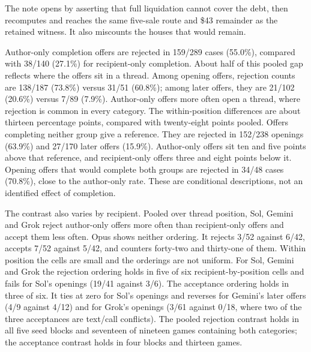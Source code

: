 
The note opens by asserting that full liquidation cannot cover the debt, then recomputes and reaches the same five-sale route and \$43 remainder as the retained witness. It also miscounts the houses that would remain.


Author-only completion offers are rejected in 159/289 cases (55.0\%), compared with 38/140 (27.1\%) for recipient-only completion. About half of this pooled gap reflects where the offers sit in a thread. Among opening offers, rejection counts are 138/187 (73.8\%) versus 31/51 (60.8\%); among later offers, they are 21/102 (20.6\%) versus 7/89 (7.9\%). Author-only offers more often open a thread, where rejection is common in every category. The within-position differences are about thirteen percentage points, compared with twenty-eight points pooled. Offers completing neither group give a reference. They are rejected in 152/238 openings (63.9\%) and 27/170 later offers (15.9\%). Author-only offers sit ten and five points above that reference, and recipient-only offers three and eight points below it. Opening offers that would complete both groups are rejected in 34/48 cases (70.8\%), close to the author-only rate. These are conditional descriptions, not an identified effect of completion.

The contrast also varies by recipient. Pooled over thread position, Sol, Gemini and Grok reject author-only offers more often than recipient-only offers and accept them less often. Opus shows neither ordering. It rejects 3/52 against 6/42, accepts 7/52 against 5/42, and counters forty-two and thirty-one of them. Within position the cells are small and the orderings are not uniform. For Sol, Gemini and Grok the rejection ordering holds in five of six recipient-by-position cells and fails for Sol's openings (19/41 against 3/6). The acceptance ordering holds in three of six. It ties at zero for Sol's openings and reverses for Gemini's later offers (4/9 against 4/12) and for Grok's openings (3/61 against 0/18, where two of the three acceptances are text/call conflicts). The pooled rejection contrast holds in all five seed blocks and seventeen of nineteen games containing both categories; the acceptance contrast holds in four blocks and thirteen games.

